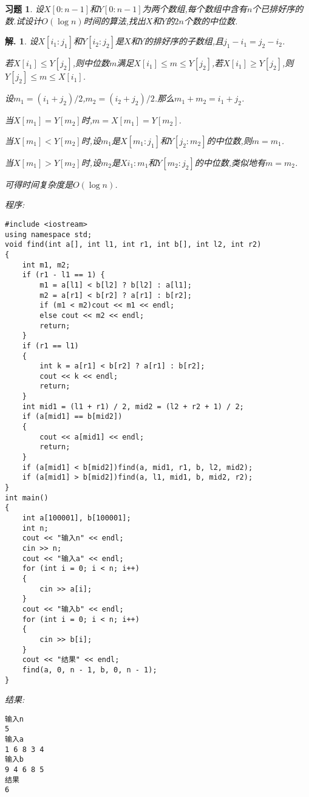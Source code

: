 \documentclass[a4paper,oneside,12pt]{ctexart}
\theoremstyle{plain}
\newtheorem{exercise}{习题}
\theoremstyle{nonumberplain}
\newtheorem{solution}{解.}
\theoremstyle{nonumberplain}
\begin{document}
    \begin{exercise}
        \label{ex:2-28}
        设$X[0:n-1]$和$Y[0:n-1]$为两个数组,每个数组中含有$n$个已排好序的数.试设计$O(\log n)$时间的算法,找出$X$和$Y$的$2n$个数的中位数.
    \end{exercise}

    \begin{solution}
        设$X[i_1:j_1]$和$Y[i_2:j_2]$是$X$和$Y$的排好序的子数组,且$j_1-i_1=j_2-i_2$.
        
        若$X[i_1]\leqslant Y[j_2]$,则中位数$m$满足$X[i_1]\leqslant m\leqslant Y[j_2]$,若$X[i_1]\geqslant Y[j_2]$,则$Y[j_2]\leqslant m\leqslant X[i_1]$.

        设$m_1=(i_1+j_2)/2$,$m_2=(i_2+j_2)/2$.那么$m_1+m_2=i_1+j_2$.

        当$X[m_1]=Y[m_2]$时,$m=X[m_1]=Y[m_2]$.

        当$X[m_1]<Y[m_2]$时,设$m_1$是$X[m_1:j_1]$和$Y[j_2:m_2]$的中位数,则$m=m_1$.

        当$X[m_1]>Y[m_2]$时,设$m_2$是$X{i_1:m_1}$和$Y[m_2:j_2]$的中位数,类似地有$m=m_2$.

        可得时间复杂度是$O(\log n)$.

        程序:
        \begin{lstlisting}
#include <iostream>
using namespace std;
void find(int a[], int l1, int r1, int b[], int l2, int r2)
{
	int m1, m2;
	if (r1 - l1 == 1) {
		m1 = a[l1] < b[l2] ? b[l2] : a[l1];
		m2 = a[r1] < b[r2] ? a[r1] : b[r2];
		if (m1 < m2)cout << m1 << endl;
		else cout << m2 << endl;
		return;
	}
	if (r1 == l1)
	{
		int k = a[r1] < b[r2] ? a[r1] : b[r2];
		cout << k << endl;
		return;
	}
	int mid1 = (l1 + r1) / 2, mid2 = (l2 + r2 + 1) / 2;
	if (a[mid1] == b[mid2])
	{
		cout << a[mid1] << endl;
		return;
	}
	if (a[mid1] < b[mid2])find(a, mid1, r1, b, l2, mid2);
	if (a[mid1] > b[mid2])find(a, l1, mid1, b, mid2, r2);
}
int main()
{
	int a[100001], b[100001];
	int n;
	cout << "输入n" << endl;
	cin >> n;
	cout << "输入a" << endl;
	for (int i = 0; i < n; i++)
	{
		cin >> a[i];
	}
	cout << "输入b" << endl;
	for (int i = 0; i < n; i++)
	{
		cin >> b[i];
	}
	cout << "结果" << endl;
	find(a, 0, n - 1, b, 0, n - 1);
}
        \end{lstlisting}
        结果:
        \begin{lstlisting}
输入n
5
输入a
1 6 8 3 4
输入b
9 4 6 8 5
结果
6
        \end{lstlisting}
    \end{solution}
\end{document}
